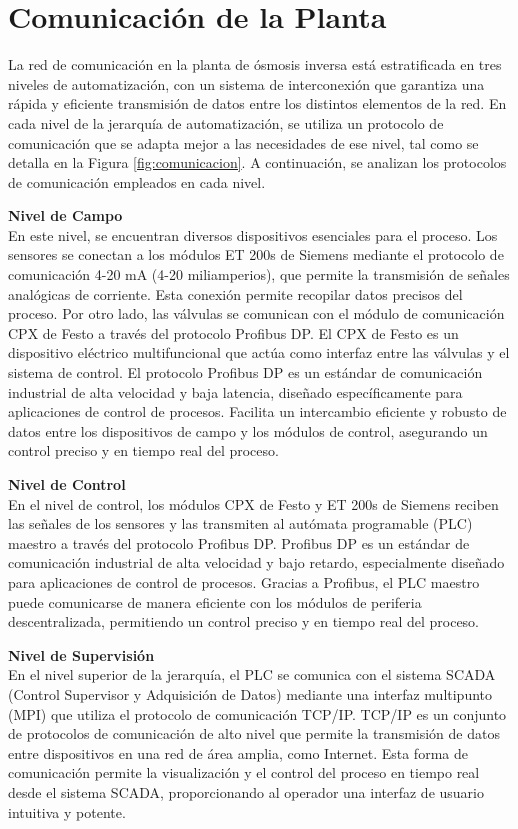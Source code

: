 \section{Comunicación de la Planta}

La red de comunicación en la planta de ósmosis inversa está
estratificada en tres niveles de automatización, con un sistema
de interconexión que garantiza una rápida y eficiente transmisión
de datos entre los distintos elementos de la red. En cada nivel
de la jerarquía de automatización, se utiliza un protocolo de
comunicación que se adapta mejor a las necesidades
de ese nivel, tal como se detalla en la Figura \ref{fig:comunicacion}.
A continuación, se analizan los protocolos de comunicación empleados
en cada nivel.

\textbf{Nivel de Campo}\\
En este nivel, se encuentran
diversos dispositivos esenciales para el proceso. Los sensores se conectan a
los módulos ET 200s de Siemens mediante el protocolo de comunicación 4-20 mA
(4-20 miliamperios), que permite la transmisión de señales analógicas de corriente.
Esta conexión permite recopilar datos precisos del proceso. Por otro lado,
las válvulas se comunican con el módulo de comunicación CPX de Festo a través
del protocolo Profibus DP. El CPX de Festo es un dispositivo eléctrico multifuncional
que actúa como interfaz entre las válvulas y el sistema de control.
El protocolo Profibus DP es un estándar de comunicación industrial de alta
velocidad y baja latencia, diseñado específicamente para aplicaciones de control
de procesos. Facilita un intercambio eficiente y robusto de datos entre los
dispositivos de campo y los módulos de control, asegurando un control preciso
y en tiempo real del proceso.

\textbf{Nivel de Control}\\
En el nivel de control, los módulos CPX de Festo y ET 200s de
Siemens reciben las señales de los sensores y las transmiten al
autómata programable (PLC) maestro a través del protocolo Profibus DP.
Profibus DP es un estándar de comunicación industrial de alta velocidad
y bajo retardo, especialmente diseñado para aplicaciones de control de
procesos. Gracias a Profibus, el PLC maestro puede comunicarse de manera
eficiente con los módulos de periferia descentralizada,
permitiendo un control preciso y en tiempo real del proceso.

\textbf{Nivel de Supervisión}\\
En el nivel superior de la jerarquía, el PLC se comunica con el sistema SCADA (Control Supervisor y Adquisición de Datos) mediante una interfaz multipunto (MPI) que utiliza el protocolo de comunicación TCP/IP. TCP/IP es un conjunto de protocolos de comunicación de alto nivel que permite la transmisión de datos entre dispositivos en una red de área amplia, como Internet. Esta forma de comunicación permite la visualización y el control del proceso en tiempo real desde el sistema SCADA, proporcionando al operador una interfaz de usuario intuitiva y potente.

